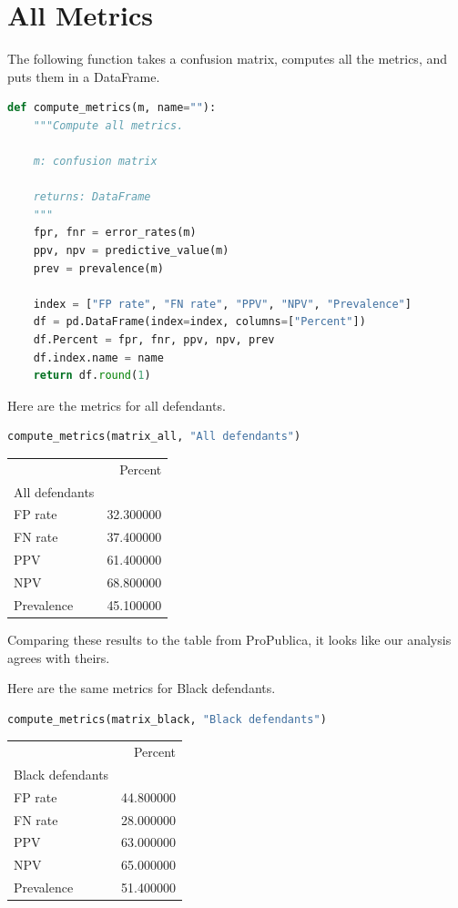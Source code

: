 \hypertarget{all-metrics}{%
\section{All Metrics}\label{all-metrics}}

The following function takes a confusion matrix, computes all the
metrics, and puts them in a DataFrame.

\begin{lstlisting}[language=Python,style=source]
def compute_metrics(m, name=""):
    """Compute all metrics.

    m: confusion matrix

    returns: DataFrame
    """
    fpr, fnr = error_rates(m)
    ppv, npv = predictive_value(m)
    prev = prevalence(m)

    index = ["FP rate", "FN rate", "PPV", "NPV", "Prevalence"]
    df = pd.DataFrame(index=index, columns=["Percent"])
    df.Percent = fpr, fnr, ppv, npv, prev
    df.index.name = name
    return df.round(1)
\end{lstlisting}

Here are the metrics for all defendants.

\begin{lstlisting}[language=Python,style=source]
compute_metrics(matrix_all, "All defendants")
\end{lstlisting}

\begin{tabular}{lr}
\midrule
 & Percent \\
All defendants &  \\
\midrule
FP rate & 32.300000 \\
FN rate & 37.400000 \\
PPV & 61.400000 \\
NPV & 68.800000 \\
Prevalence & 45.100000 \\
\midrule
\end{tabular}

Comparing these results to the table from ProPublica, it looks like our
analysis agrees with theirs.

Here are the same metrics for Black defendants.

\begin{lstlisting}[language=Python,style=source]
compute_metrics(matrix_black, "Black defendants")
\end{lstlisting}

\begin{tabular}{lr}
\midrule
 & Percent \\
Black defendants &  \\
\midrule
FP rate & 44.800000 \\
FN rate & 28.000000 \\
PPV & 63.000000 \\
NPV & 65.000000 \\
Prevalence & 51.400000 \\
\midrule
\end{tabular}

